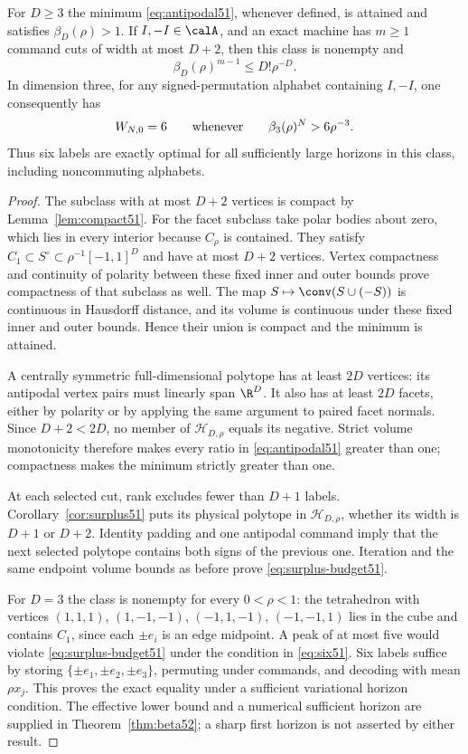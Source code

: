 \begin{theorem}
\label{thm:surplus-budget51}
For $D\ge3$ the minimum \eqref{eq:antipodal51}, whenever defined,
is attained and satisfies $\beta_D(\rho)>1$.
If $I,-I\in\calA$, and an exact machine has $m\ge1$ command cuts
of width at most $D+2$, then this class is nonempty and
\begin{equation}\label{eq:surplus-budget51}
 \beta_D(\rho)^{m-1}\le D!\rho^{-D}.
\end{equation}
In dimension three, for any signed-permutation alphabet containing
$I,-I$, one consequently has
\begin{equation}\label{eq:six51}
 W_{N,0}=6\qquad\hbox{whenever}\qquad
 \beta_3(\rho)^N>6\rho^{-3}.
\end{equation}
Thus six labels are exactly optimal for all sufficiently large
horizons in this class, including noncommuting alphabets.
\end{theorem}
\begin{proof}
The subclass with at most $D+2$ vertices is compact by
Lemma~\ref{lem:compact51}. For the facet subclass take polar bodies
about zero, which lies in every interior because $C_\rho$ is contained. They satisfy
$C_1\subset S^\circ\subset\rho^{-1}[-1,1]^D$ and have at most
$D+2$ vertices. Vertex compactness and continuity of polarity between
these fixed inner and outer bounds prove compactness of that
subclass as well. The map $S\mapsto\conv(S\cup(-S))$ is continuous
in Hausdorff distance, and its volume is continuous under these fixed
inner and outer bounds. Hence their union is compact and the minimum is
attained.

A centrally symmetric full-dimensional polytope has at least $2D$
vertices: its antipodal vertex pairs must linearly span $\R^D$.
It also has at least $2D$ facets, either by polarity or by applying
the same argument to paired facet normals. Since $D+2<2D$, no member
of $\mathscr H_{D,\rho}$ equals its negative. Strict volume
monotonicity therefore makes every ratio in
\eqref{eq:antipodal51} greater than one; compactness makes the
minimum strictly greater than one.

At each selected cut, rank excludes fewer than $D+1$ labels.
Corollary~\ref{cor:surplus51} puts its physical polytope in
$\mathscr H_{D,\rho}$, whether its width is $D+1$ or $D+2$.
Identity padding and one antipodal command imply that the next
selected polytope contains both signs of the previous one.
Iteration and the same endpoint volume bounds as before prove
\eqref{eq:surplus-budget51}.

For $D=3$ the class is nonempty for every $0<\rho<1$: the tetrahedron
with vertices $(1,1,1)$, $(1,-1,-1)$, $(-1,1,-1)$, $(-1,-1,1)$
lies in the cube and contains $C_1$, since each $\pm e_i$ is an
edge midpoint. A peak of at most five would violate
\eqref{eq:surplus-budget51} under the condition in \eqref{eq:six51}.
Six labels suffice by storing $\{\pm e_1,\pm e_2,\pm e_3\}$,
permuting under commands, and decoding with mean $\rho x_j$.
This proves the exact equality under a sufficient variational horizon
condition. The effective lower bound and a numerical sufficient horizon
are supplied in Theorem~\ref{thm:beta52}; a sharp first horizon is not
asserted by either result.
\end{proof}
